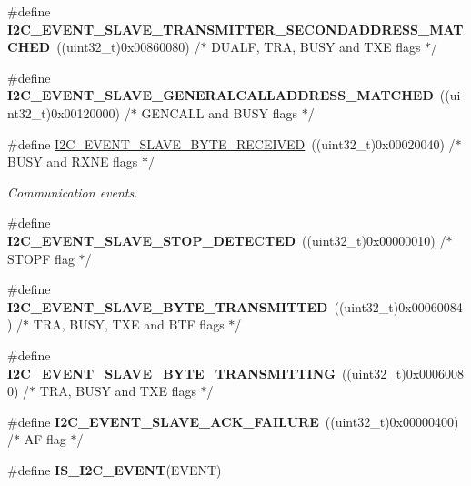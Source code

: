 \begin{DoxyCompactItemize}
\item 
\hypertarget{group___i2_c___events_ga6221aa204356bec9146f800ccfc99fc1}{\#define {\bfseries I2\-C\-\_\-\-E\-V\-E\-N\-T\-\_\-\-S\-L\-A\-V\-E\-\_\-\-T\-R\-A\-N\-S\-M\-I\-T\-T\-E\-R\-\_\-\-S\-E\-C\-O\-N\-D\-A\-D\-D\-R\-E\-S\-S\-\_\-\-M\-A\-T\-C\-H\-E\-D}~((uint32\-\_\-t)0x00860080)  /$\ast$ D\-U\-A\-L\-F, T\-R\-A, B\-U\-S\-Y and T\-X\-E flags $\ast$/}\label{group___i2_c___events_ga6221aa204356bec9146f800ccfc99fc1}

\item 
\hypertarget{group___i2_c___events_ga15195f6def95f688ae9725899f49ea23}{\#define {\bfseries I2\-C\-\_\-\-E\-V\-E\-N\-T\-\_\-\-S\-L\-A\-V\-E\-\_\-\-G\-E\-N\-E\-R\-A\-L\-C\-A\-L\-L\-A\-D\-D\-R\-E\-S\-S\-\_\-\-M\-A\-T\-C\-H\-E\-D}~((uint32\-\_\-t)0x00120000)  /$\ast$ G\-E\-N\-C\-A\-L\-L and B\-U\-S\-Y flags $\ast$/}\label{group___i2_c___events_ga15195f6def95f688ae9725899f49ea23}

\item 
\#define \hyperlink{group___i2_c___events_ga8b244626839940569c6c8bbfc4efe21d}{I2\-C\-\_\-\-E\-V\-E\-N\-T\-\_\-\-S\-L\-A\-V\-E\-\_\-\-B\-Y\-T\-E\-\_\-\-R\-E\-C\-E\-I\-V\-E\-D}~((uint32\-\_\-t)0x00020040)  /$\ast$ B\-U\-S\-Y and R\-X\-N\-E flags $\ast$/
\begin{DoxyCompactList}\small\item\em Communication events. \end{DoxyCompactList}\item 
\hypertarget{group___i2_c___events_ga3148d8d7087e418959bc31e2646b2941}{\#define {\bfseries I2\-C\-\_\-\-E\-V\-E\-N\-T\-\_\-\-S\-L\-A\-V\-E\-\_\-\-S\-T\-O\-P\-\_\-\-D\-E\-T\-E\-C\-T\-E\-D}~((uint32\-\_\-t)0x00000010)  /$\ast$ S\-T\-O\-P\-F flag $\ast$/}\label{group___i2_c___events_ga3148d8d7087e418959bc31e2646b2941}

\item 
\hypertarget{group___i2_c___events_ga50652880323b8c2746b5afbdfea03fe1}{\#define {\bfseries I2\-C\-\_\-\-E\-V\-E\-N\-T\-\_\-\-S\-L\-A\-V\-E\-\_\-\-B\-Y\-T\-E\-\_\-\-T\-R\-A\-N\-S\-M\-I\-T\-T\-E\-D}~((uint32\-\_\-t)0x00060084)  /$\ast$ T\-R\-A, B\-U\-S\-Y, T\-X\-E and B\-T\-F flags $\ast$/}\label{group___i2_c___events_ga50652880323b8c2746b5afbdfea03fe1}

\item 
\hypertarget{group___i2_c___events_gaa574c93a99497649f3d8e7ff53796231}{\#define {\bfseries I2\-C\-\_\-\-E\-V\-E\-N\-T\-\_\-\-S\-L\-A\-V\-E\-\_\-\-B\-Y\-T\-E\-\_\-\-T\-R\-A\-N\-S\-M\-I\-T\-T\-I\-N\-G}~((uint32\-\_\-t)0x00060080)  /$\ast$ T\-R\-A, B\-U\-S\-Y and T\-X\-E flags $\ast$/}\label{group___i2_c___events_gaa574c93a99497649f3d8e7ff53796231}

\item 
\hypertarget{group___i2_c___events_ga249bd611f1ca64653c0bfc606c591088}{\#define {\bfseries I2\-C\-\_\-\-E\-V\-E\-N\-T\-\_\-\-S\-L\-A\-V\-E\-\_\-\-A\-C\-K\-\_\-\-F\-A\-I\-L\-U\-R\-E}~((uint32\-\_\-t)0x00000400)  /$\ast$ A\-F flag $\ast$/}\label{group___i2_c___events_ga249bd611f1ca64653c0bfc606c591088}

\item 
\#define {\bfseries I\-S\-\_\-\-I2\-C\-\_\-\-E\-V\-E\-N\-T}(E\-V\-E\-N\-T)
\end{DoxyCompactItemize}


